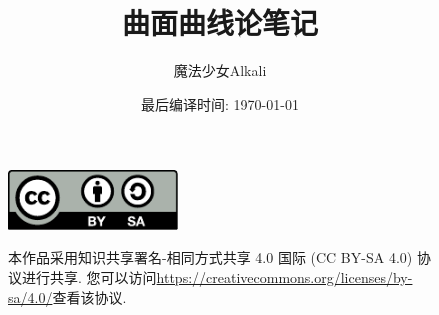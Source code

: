 \documentclass[11pt]{book}
\title{曲面曲线论笔记}
\author{魔法少女Alkali}
\affil{北京师范大学数学科学学院}
\date{最后编译时间: \today}
\numberwithin{equation}{section}
\theoremstyle{definition}
\theoremstyle{plain}
\theoremstyle{remark}
\begin{document}
    \maketitle
    \vspace*{13cm}
    \thispagestyle{empty}
    \begin{figure}[ht]
        \includegraphics[width=0.4\textwidth]{by-sa.pdf}\hspace{0.05\textwidth}
        \begin{minipage}[b]{0.54\textwidth} %
        \small
        本作品采用知识共享署名-相同方式共享 4.0 国际 (CC BY-SA 4.0) 协议进行共享.
        您可以访问\url{https://creativecommons.org/licenses/by-sa/4.0/}查看该协议.
        \end{minipage}
    \end{figure}

    \frontmatter
    

    \tableofcontents

    \mainmatter
    
    
    
    
    

    \appendix
    \printbibliography[title={参考文献},heading=bibintoc]
\end{document}
